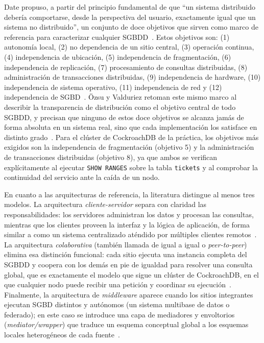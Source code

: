 \documentclass[11pt,a4paper]{article}
\begin{document}
Date propuso, a partir del principio fundamental de que ``un sistema distribuido
deber\'ia comportarse, desde la perspectiva del usuario, exactamente igual que un
sistema no distribuido'', un conjunto de doce objetivos que sirven como marco de
referencia para caracterizar cualquier SGBDD~\cite{date2000}. Estos objetivos son:
(1) autonom\'ia local, (2) no dependencia de un sitio central, (3) operaci\'on
continua, (4) independencia de ubicaci\'on, (5) independencia de fragmentaci\'on,
(6) independencia de replicaci\'on, (7) procesamiento de consultas distribuidas,
(8) administraci\'on de transacciones distribuidas, (9) independencia de
hardware, (10) independencia de sistema operativo, (11) independencia de red y
(12) independencia de SGBD~\cite{date2000,ozsu2020}. Özsu y Valduriez retoman este mismo
marco al describir la transparencia de distribuci\'on como el objetivo central
de todo SGBDD, y precisan que ninguno de estos doce objetivos se alcanza jam\'as
de forma absoluta en un sistema real, sino que cada implementaci\'on los satisface
en distinto grado~\cite{ozsu2020}. Para el cl\'uster de CockroachDB de la
pr\'actica, los objetivos m\'as exigidos son la independencia de fragmentaci\'on
(objetivo 5) y la administraci\'on de transacciones distribuidas (objetivo 8),
ya que ambos se verifican expl\'icitamente al ejecutar \texttt{SHOW RANGES}
sobre la tabla \texttt{tickets} y al
comprobar la continuidad del servicio ante la ca\'ida de un nodo.

En cuanto a las arquitecturas de referencia, la literatura distingue al menos
tres modelos. La arquitectura \emph{cliente-servidor} separa con claridad las
responsabilidades: los servidores administran los datos y procesan las
consultas, mientras que los clientes proveen la interfaz y la l\'ogica de
aplicaci\'on, de forma similar a como un sistema centralizado at\'endido por
m\'ultiples clientes remotos~\cite{ozsu2020,coulouris2012}. La arquitectura
\emph{colaborativa} (tambi\'en llamada de igual a igual o \emph{peer-to-peer})
elimina esa distinci\'on funcional: cada sitio ejecuta una instancia completa
del SGBDD y coopera con los dem\'as en pie de igualdad para resolver una
consulta global, que es exactamente el modelo que sigue un cl\'uster de
CockroachDB, en el que cualquier nodo puede recibir una petici\'on y coordinar
su ejecuci\'on~\cite{ozsu2020,coulouris2012}. Finalmente, la arquitectura de \emph{middleware}
aparece cuando los sitios integrantes ejecutan SGBD distintos y aut\'onomos
(un sistema multibase de datos o federado); en este caso se introduce una capa
de mediadores y envoltorios (\emph{mediator/wrapper}) que traduce un esquema
conceptual global a los esquemas locales heterog\'eneos de cada
fuente~\cite{ozsu2020,valduriez2011}.
\end{document}
